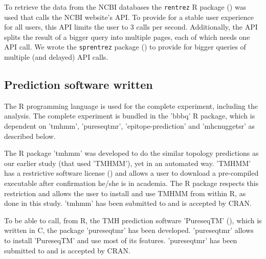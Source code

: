 
To retrieve the data from the NCBI databases the
\verb;rentrez; R package (\cite{rentrez}) was used
that calls the NCBI website's API. To provide for a 
stable user experience for all users, 
this API limits the user to 3 calls per second.
Additionally, the API splits the result of a bigger
query into multiple pages, each of which needs one API call.
We wrote the \verb;sprentrez; package (\cite{sprentrez}) to provide for 
bigger queries of multiple (and delayed) API calls.

\subsection{Prediction software written}

The R programming language is used for the complete 
experiment, including the analysis.
The complete experiment is bundled in the 'bbbq' R package,
which is dependent on 'tmhmm', 'pureseqtmr', 
'epitope-prediction' and 'mhcnuggetsr'
as described below.


The R package 'tmhmm' was developed to do the similar topology
predictions as our earlier study (that used 'TMHMM'), yet in an automated way.
'TMHMM' has a restrictive software license (\cite{krogh2001predicting}) and allows a user
to download a pre-compiled executable after confirmation he/she
is in academia. The R package respects this restriction
and allows the user to install and use TMHMM from within R,
as done in this study.
'tmhmm' has been submitted to and is accepted by CRAN. 


To be able to call, from R, the TMH prediction 
software 'PureseqTM' (\cite{wang2019efficient}),
which is written in C, the package 'pureseqtmr' has been developed. 
'pureseqtmr' allows to install 'PureseqTM' and use most of its features.
'pureseqtmr' has been submitted to and is accepted by CRAN.

